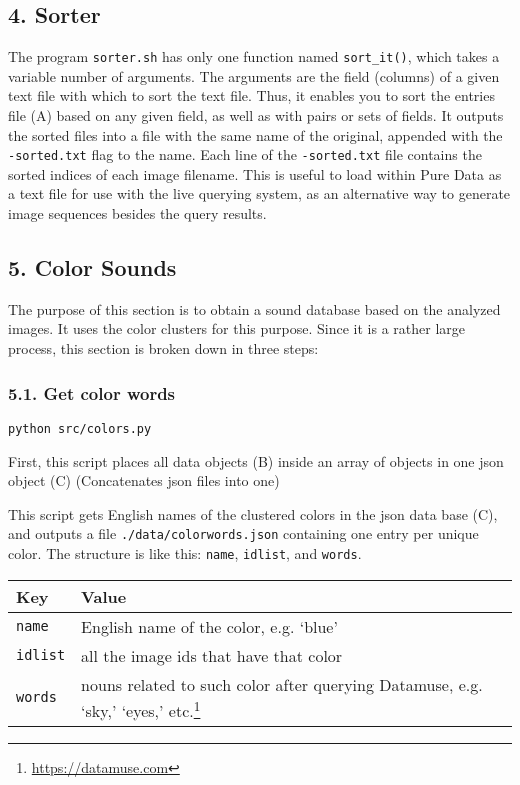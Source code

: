 \subsection*{4. Sorter}

The program \texttt{sorter.sh} has only one function named \texttt{sort\_it()}, which takes a variable number of arguments. The arguments are the field (columns) of a given text file with which to sort the text file. Thus, it enables you to sort the entries file (A) based on any given field, as well as with pairs or sets of fields. It outputs the sorted files into a file with the same name of the original, appended with the \texttt{-sorted.txt} flag to the name. Each line of the \texttt{-sorted.txt} file contains the sorted indices of each image filename. This is useful to load within Pure Data as a text file for use with the live querying system, as an alternative way to generate image sequences besides the query results.



\subsection*{5. Color Sounds}

The purpose of this section is to obtain a sound database based on the analyzed images. It uses the color clusters for this purpose. Since it is a rather large process, this section is broken down in three steps:


\subsubsection*{5.1. Get color words}

\texttt{python\ src/colors.py}

First, this script places all data objects (B) inside an array of objects in one \gls{json} object (C) (Concatenates \gls{json} files into one)

This script gets English names of the clustered colors in the \gls{json} data base (C), and outputs a file \texttt{./data/colorwords.json} containing one entry per unique color. The structure is like this: \texttt{name}, \texttt{idlist}, and \texttt{words}.

\begin{table}
\begin{tabular}{l | l}

Key     & Value

\tabularnewline
\hline


\texttt{name}    & English name of the color, e.g. `blue'

\tabularnewline
\hline

\texttt{idlist}  & all the image ids that have that color

\tabularnewline
\hline

\texttt{words}   & nouns related to such color after querying Datamuse, e.g. `sky,' `eyes,' etc.\footnote{\url{https://datamuse.com}} 

\end{tabular}
\end{table}


